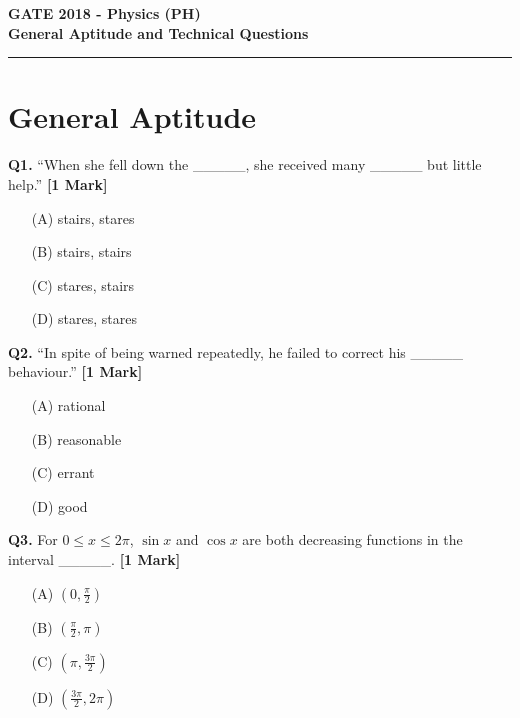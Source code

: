 \documentclass[11pt]{article}
\newcommand{\questiona}[2]{
    \noindent\textbf{Q#2.} #1 \hfill \textbf{[1 Mark]}
}
\begin{document}
\begin{center}
    \Large\textbf{GATE 2018 - Physics (PH)} \\
    \large\textbf{General Aptitude and Technical Questions} \\
    \rule{\textwidth}{0.5pt} %
\end{center}

\vspace{0.5cm}

\section*{General Aptitude}

\questiona{``When she fell down the \_\_\_\_\_, she received many \_\_\_\_\_ but little help.''}{1}
\begin{enumerate}
    \item[(A)] stairs, stares  
    \item[(B)] stairs, stairs  
    \item[(C)] stares, stairs  
    \item[(D)] stares, stares  
\end{enumerate}
\vspace{0.5cm}

\questiona{``In spite of being warned repeatedly, he failed to correct his \_\_\_\_\_ behaviour.''}{2}
\begin{enumerate}
    \item[(A)] rational  
    \item[(B)] reasonable  
    \item[(C)] errant  
    \item[(D)] good  
\end{enumerate}
\vspace{0.5cm}

\questiona{For \(0 \leq x \leq 2\pi\), \(\sin x\) and \(\cos x\) are both decreasing functions in the interval \_\_\_\_\_.}{3}
\begin{enumerate}
    \item[(A)] \((0, \frac{\pi}{2})\)  
    \item[(B)] \((\frac{\pi}{2}, \pi)\)  
    \item[(C)] \((\pi, \frac{3\pi}{2})\)  
    \item[(D)] \((\frac{3\pi}{2}, 2\pi)\)  
\end{enumerate}
\vspace{0.5cm}
\end{document}
